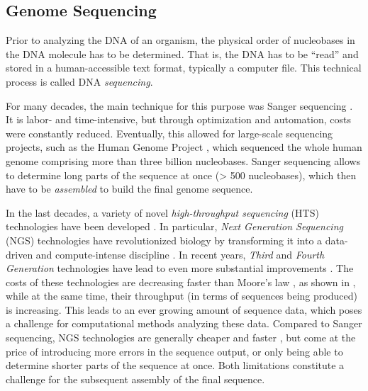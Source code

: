 \subsection{Genome Sequencing}
\label{ch:Foundations:sec:SequenceAnalysis:sub:GenomeSequencing}

Prior to analyzing the \ac{DNA} of an organism, the physical order of nucleobases in the \ac{DNA} molecule has to be determined.
That is, the \ac{DNA} has to be ``read'' and stored in a human-accessible text format, typically a computer file.
This technical process is called \ac{DNA} \emph{sequencing}.

For many decades, the main technique for this purpose was Sanger sequencing \cite{Sanger1975,Sanger1977}.
It is labor- and time-intensive, but through optimization and automation, costs were constantly reduced.
Eventually, this allowed for large-scale sequencing projects, such as the Human Genome Project \cite{Venter2001},
which sequenced the whole human genome comprising more than three billion nucleobases.
Sanger sequencing allows to determine long parts of the sequence at once (> \num{500} nucleobases),
which then have to be \emph{assembled} to build the final genome sequence.

In the last decades, a variety of novel \emph{high-throughput sequencing} (HTS) technologies
have been developed \cite{Pettersson2009,Reuter2015,Goodwin2016}.
In particular, \emph{Next Generation Sequencing} (NGS) technologies \cite{Logares2012,Mardis2013}
have revolutionized biology by transforming it into a data-driven and compute-intense discipline \cite{Escobar-Zepeda2015}.
In recent years, \emph{Third} and \emph{Fourth Generation} technologies
have lead to even more substantial improvements \cite{Pareek2011,Niedringhaus2011,Mignardi2014,Heather2016}.
The costs of these technologies are decreasing faster than Moore's law \cite{Moore1965,Wetterstrand2018},
as shown in ,
while at the same time, their throughput (in terms of sequences being produced) is increasing.
This leads to an ever growing amount of sequence data,
which poses a challenge for computational methods analyzing these data.
Compared to Sanger sequencing, NGS technologies are generally cheaper and faster \cite{Voelkerding2009,Metzker2010},
but come at the price of introducing more errors in the sequence output,
or only being able to determine shorter parts of the sequence at once.
Both limitations constitute a challenge for the subsequent assembly of the final sequence.

